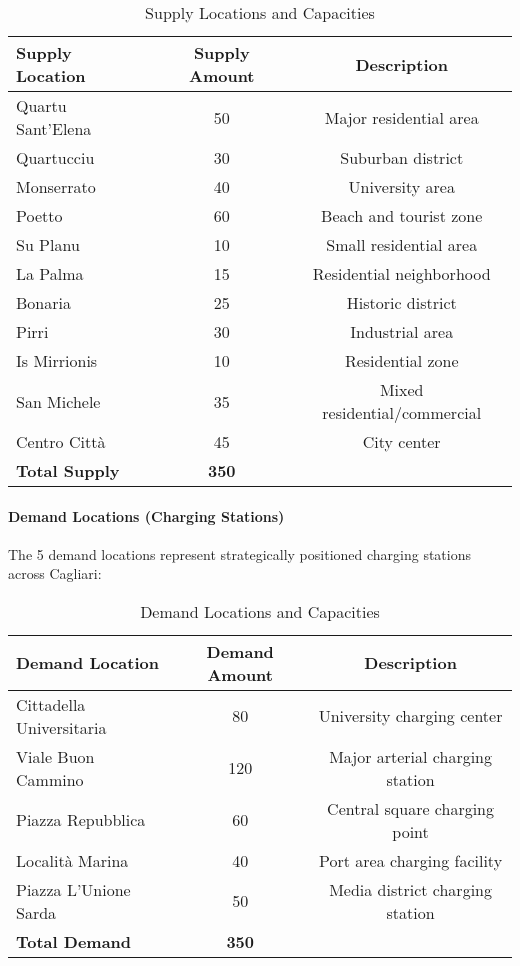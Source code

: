 \documentclass[12pt,a4paper]{article}
\begin{document}
\begin{table}[H]
\centering
\caption{Supply Locations and Capacities}
\label{tab:supply_data}
\begin{tabular}{@{}lcc@{}}
\toprule
\textbf{Supply Location} & \textbf{Supply Amount} & \textbf{Description} \\
\midrule
Quartu Sant'Elena & 50 & Major residential area \\
Quartucciu & 30 & Suburban district \\
Monserrato & 40 & University area \\
Poetto & 60 & Beach and tourist zone \\
Su Planu & 10 & Small residential area \\
La Palma & 15 & Residential neighborhood \\
Bonaria & 25 & Historic district \\
Pirri & 30 & Industrial area \\
Is Mirrionis & 10 & Residential zone \\
San Michele & 35 & Mixed residential/commercial \\
Centro Città & 45 & City center \\
\midrule
\textbf{Total Supply} & \textbf{350} & \\
\bottomrule
\end{tabular}
\end{table}

\paragraph{Demand Locations (Charging Stations)}
The 5 demand locations represent strategically positioned charging stations across Cagliari:

\begin{table}[H]
\centering
\caption{Demand Locations and Capacities}
\label{tab:demand_data}
\begin{tabular}{@{}lcc@{}}
\toprule
\textbf{Demand Location} & \textbf{Demand Amount} & \textbf{Description} \\
\midrule
Cittadella Universitaria & 80 & University charging center \\
Viale Buon Cammino & 120 & Major arterial charging station \\
Piazza Repubblica & 60 & Central square charging point \\
Località Marina & 40 & Port area charging facility \\
Piazza L'Unione Sarda & 50 & Media district charging station \\
\midrule
\textbf{Total Demand} & \textbf{350} & \\
\bottomrule
\end{tabular}
\end{table}
\end{document}
